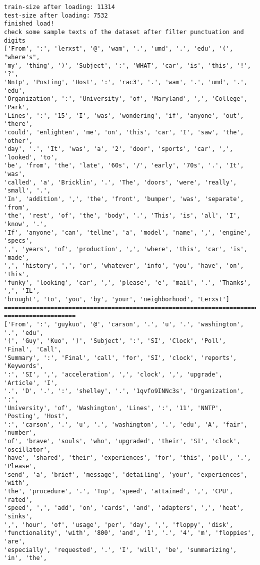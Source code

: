 \documentclass[11pt]{article}
\begin{document}
\begin{Verbatim}[commandchars=\\\{\}]
train-size after loading: 11314
test-size after loading: 7532
finished load!
check some sample texts of the dataset after filter punctuation and digits
['From', ':', 'lerxst', '@', 'wam', '.', 'umd', '.', 'edu', '(', "where's",
'my', 'thing', ')', 'Subject', ':', 'WHAT', 'car', 'is', 'this', '!', '?',
'Nntp', 'Posting', 'Host', ':', 'rac3', '.', 'wam', '.', 'umd', '.', 'edu',
'Organization', ':', 'University', 'of', 'Maryland', ',', 'College', 'Park',
'Lines', ':', '15', 'I', 'was', 'wondering', 'if', 'anyone', 'out', 'there',
'could', 'enlighten', 'me', 'on', 'this', 'car', 'I', 'saw', 'the', 'other',
'day', '.', 'It', 'was', 'a', '2', 'door', 'sports', 'car', ',', 'looked', 'to',
'be', 'from', 'the', 'late', '60s', '/', 'early', '70s', '.', 'It', 'was',
'called', 'a', 'Bricklin', '.', 'The', 'doors', 'were', 'really', 'small', '.',
'In', 'addition', ',', 'the', 'front', 'bumper', 'was', 'separate', 'from',
'the', 'rest', 'of', 'the', 'body', '.', 'This', 'is', 'all', 'I', 'know', '.',
'If', 'anyone', 'can', 'tellme', 'a', 'model', 'name', ',', 'engine', 'specs',
',', 'years', 'of', 'production', ',', 'where', 'this', 'car', 'is', 'made',
',', 'history', ',', 'or', 'whatever', 'info', 'you', 'have', 'on', 'this',
'funky', 'looking', 'car', ',', 'please', 'e', 'mail', '.', 'Thanks', ',', 'IL',
'brought', 'to', 'you', 'by', 'your', 'neighborhood', 'Lerxst']
================================================================================
====================
['From', ':', 'guykuo', '@', 'carson', '.', 'u', '.', 'washington', '.', 'edu',
'(', 'Guy', 'Kuo', ')', 'Subject', ':', 'SI', 'Clock', 'Poll', 'Final', 'Call',
'Summary', ':', 'Final', 'call', 'for', 'SI', 'clock', 'reports', 'Keywords',
':', 'SI', ',', 'acceleration', ',', 'clock', ',', 'upgrade', 'Article', 'I',
'.', 'D', '.', ':', 'shelley', '.', '1qvfo9INNc3s', 'Organization', ':',
'University', 'of', 'Washington', 'Lines', ':', '11', 'NNTP', 'Posting', 'Host',
':', 'carson', '.', 'u', '.', 'washington', '.', 'edu', 'A', 'fair', 'number',
'of', 'brave', 'souls', 'who', 'upgraded', 'their', 'SI', 'clock', 'oscillator',
'have', 'shared', 'their', 'experiences', 'for', 'this', 'poll', '.', 'Please',
'send', 'a', 'brief', 'message', 'detailing', 'your', 'experiences', 'with',
'the', 'procedure', '.', 'Top', 'speed', 'attained', ',', 'CPU', 'rated',
'speed', ',', 'add', 'on', 'cards', 'and', 'adapters', ',', 'heat', 'sinks',
',', 'hour', 'of', 'usage', 'per', 'day', ',', 'floppy', 'disk',
'functionality', 'with', '800', 'and', '1', '.', '4', 'm', 'floppies', 'are',
'especially', 'requested', '.', 'I', 'will', 'be', 'summarizing', 'in', 'the',

\end{Verbatim}
\end{document}

